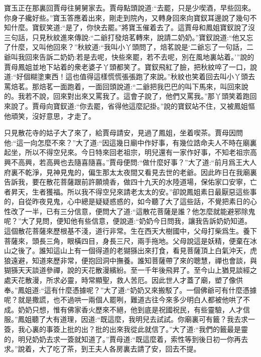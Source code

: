 \begin{parag}
    寶玉正在那裏回賈母往舅舅家去。賈母點頭說道:“去罷，只是少喫酒，早些回來。你身子纔好些。”寶玉答應着出來，剛走到院內，又轉身回來向寶釵耳邊說了幾句不知什麼。寶釵笑道:“是了，你快去罷。”將寶玉催着去了。這賈母和鳳姐寶釵說了沒三句話，只見秋紋進來傳說:“二爺打發焙茗轉來，說請二奶奶。”寶釵說道:“他又忘了什麼，又叫他回來？”秋紋道:“我叫小丫頭問了，焙茗說是‘二爺忘了一句話，二爺叫我回來告訴二奶奶:若是去呢，快些來罷，若不去呢，別在風地裏站着。’”說的賈母鳳姐並地下站着的衆老婆子丫頭都笑了。寶釵飛紅了臉，把秋紋啐了一口，說道:“好個糊塗東西！這也值得這樣慌慌張張跑了來說。”秋紋也笑着回去叫小丫頭去罵焙茗。那焙茗一面跑着，一面回頭說道:“二爺把我巴巴的叫下馬來，叫回來說的。我若不說，回來對出來又罵我了。這會子說了，他們又罵我。”那丫頭笑着跑回來說了。賈母向寶釵道:“你去罷，省得他這麼記掛。”說的寶釵站不住，又被鳳姐慪他頑笑，沒好意思，才走了。
\end{parag}


\begin{parag}
    只見散花寺的姑子大了來了，給賈母請安，見過了鳳姐，坐着喫茶。賈母因問他:“這一向怎麼不來？”大了道:“因這幾日廟中作好事，有幾位誥命夫人不時在廟裏起坐，所以不得空兒來。今日特來回老祖宗，明兒還有一家作好事，不知老祖宗高興不高興，若高興也去隨喜隨喜。”賈母便問:“做什麼好事？”大了道:“前月爲王大人府裏不乾淨，見神見鬼的，偏生那太太夜間又看見去世的老爺。因此昨日在我廟裏告訴我，要在散花菩薩跟前許願燒香，做四十九天的水陸道場，保佑家口安寧，亡者昇天，生者獲福。所以我不得空兒來請老太太的安。”卻說鳳姐素日最厭惡這些事的，自從昨夜見鬼，心中總是疑疑惑惑的，如今聽了大了這些話，不覺把素日的心性改了一半，已有三分信意，便問大了道:“這散花菩薩是誰？他怎麼就能避邪除鬼呢？”大了見問，便知他有些信意，便說道:“奶奶今日問我，讓我告訴奶奶知道。這個散花菩薩來歷根基不淺，道行非常。生在西天大樹國中，父母打柴爲生。養下菩薩來，頭長三角，眼橫四目，身長三尺，兩手拖地。父母說這是妖精，便棄在冰山之後了。誰知這山上有一個得道的老猢猻出來打食，看見菩薩頂上白氣沖天，虎狼遠避，知道來歷非常，便抱回洞中撫養。誰知菩薩帶了來的聰慧，禪也會談，與猢猻天天談道參禪，說的天花散漫繽紛。至一千年後飛昇了。至今山上猶見談經之處天花散漫，所求必靈，時常顯聖，救人苦厄。因此世人才蓋了廟，塑了像供奉。”鳳姐道:“這有什麼憑據呢？”大了道:“奶奶又來搬駁了。一個佛爺可有什麼憑據呢？就是撒謊，也不過哄一兩個人罷咧，難道古往今來多少明白人都被他哄了不成。奶奶只想，惟有佛家香火歷來不絕，他到底是祝國祝民，有些靈驗，人才信服。”鳳姐聽了大有道理，因道:“既這麼，我明兒去試試。你廟裏可有籤？我去求一簽，我心裏的事簽上批的出？批的出來我從此就信了。”大了道:“我們的籤最是靈的，明兒奶奶去求一簽就知道了。”賈母道:“既這麼着，索性等到後日初一你再去求。”說着，大了吃了茶，到王夫人各房裏去請了安，回去不提。
\end{parag}


